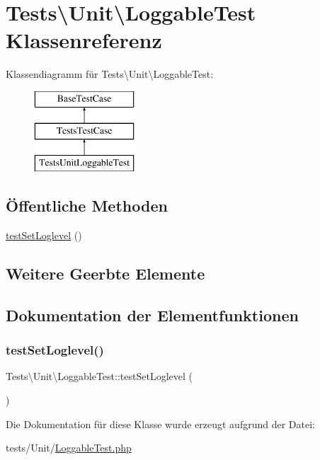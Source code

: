 \hypertarget{classTests_1_1Unit_1_1LoggableTest}{}\section{Tests\textbackslash{}Unit\textbackslash{}Loggable\+Test Klassenreferenz}
\label{classTests_1_1Unit_1_1LoggableTest}
Klassendiagramm für Tests\textbackslash{}Unit\textbackslash{}Loggable\+Test\+:\begin{figure}[H]
\begin{center}
\leavevmode
\includegraphics[height=3.000000cm]{d1/d80/classTests_1_1Unit_1_1LoggableTest}
\end{center}
\end{figure}
\subsection*{Öffentliche Methoden}
\begin{DoxyCompactItemize}
\item 
\hyperlink{classTests_1_1Unit_1_1LoggableTest_ade49c3987fc880effff64ef9a42503d9}{test\+Set\+Loglevel} ()
\end{DoxyCompactItemize}
\subsection*{Weitere Geerbte Elemente}


\subsection{Dokumentation der Elementfunktionen}
\mbox{\label{classTests_1_1Unit_1_1LoggableTest_ade49c3987fc880effff64ef9a42503d9}} 
\subsubsection{\texorpdfstring{test\+Set\+Loglevel()}{testSetLoglevel()}}
{\footnotesize\ttfamily Tests\textbackslash{}\+Unit\textbackslash{}\+Loggable\+Test\+::test\+Set\+Loglevel (\begin{DoxyParamCaption}{ }\end{DoxyParamCaption})}



Die Dokumentation für diese Klasse wurde erzeugt aufgrund der Datei\+:\begin{DoxyCompactItemize}
\item 
tests/\+Unit/\hyperlink{LoggableTest_8php}{Loggable\+Test.\+php}\end{DoxyCompactItemize}
